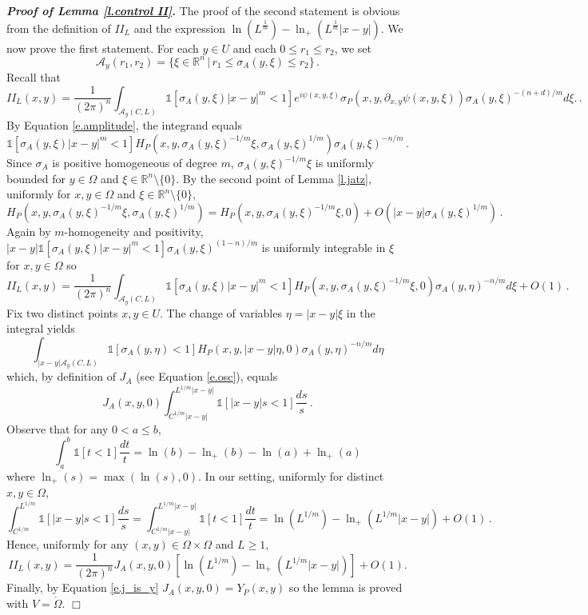 \documentclass[10pt,twoside]{article}
\newcommand{\R}{\mathbb{R}}
\newcommand{\one}{\mathds{1}}
\newcommand{\calA}{\mathcal{A}}
\newenvironment{prf}[1][]
{\vskip 2mm  {\it \bf Proof#1. }}{$\Box$ \vskip 2mm}
\numberwithin{theorem}{section}
\begin{document}
\begin{prf}[ of Lemma \ref{l.control II}]
The proof of the second statement is obvious from the definition of $II_L$ and the expression $\ln\left(L^{\frac{1}{m}}\right)-\ln_+\left(L^{\frac{1}{m}}|x-y|\right)$. We now prove the first statement. For each $y\in U$ and each $0\leq r_1\leq r_2$, we set
\[
\calA_y(r_1,r_2)=\{\xi\in\R^n\, |\, r_1\leq \sigma_A(y,\xi)\leq r_2\}\, .
\]
Recall that
\[
II_L(x,y)=\frac{1}{(2\pi)^n}\int_{\calA_y(C,L)}\one[\sigma_A(y,\xi)|x-y|^m< 1]e^{i\psi(x,y,\xi)}\sigma_P(x,y,\partial_{x,y}\psi(x,y,\xi))\sigma_A(y,\xi)^{-(n+d)/m}d\xi.\, .
\] 
By Equation \eqref{e.amplitude}, the integrand equals
\[
\one[\sigma_A(y,\xi)|x-y|^m< 1]H_P\left(x,y,\sigma_A(y,\xi)^{-1/m}\xi,\sigma_A(y,\xi)^{1/m}\right)\sigma_A(y,\xi)^{-n/m}\, .
\]
Since $\sigma_A$ is positive homogeneous of degree $m$, $\sigma_A(y,\xi)^{-1/m}\xi$ is uniformly bounded for $y\in\Omega$ and $\xi\in\R^n\setminus\{0\}$. By the second point of Lemma \ref{l.jatz}, uniformly for $x,y\in\Omega$ and $\xi\in\R^n\setminus\{0\}$,
\[
H_P\left(x,y,\sigma_A(y,\xi)^{-1/m}\xi,\sigma_A(y,\xi)^{1/m}\right)=H_P\left(x,y,\sigma_A(y,\xi)^{-1/m}\xi,0\right)+O\left(|x-y|\sigma_A(y,\xi)^{1/m}\right)\, .
\]
Again by $m$-homogeneity and positivity, $|x-y|\one[\sigma_A(y,\xi)|x-y|^m< 1]\sigma_A(y,\xi)^{(1-n)/m}$ is uniformly integrable in $\xi$ for $x,y\in\Omega$ so
\[
II_L(x,y)=\frac{1}{(2\pi)^n}\int_{\calA_y(C,L)}\one[\sigma_A(y,\xi)|x-y|^m< 1]H_P\left(x,y,\sigma_A(y,\xi)^{-1/m}\xi,0\right)\sigma_A(y,\eta)^{-n/m}d\xi+O(1)\, .
\]
Fix two distinct points $x,y\in U$. The change of variables $\eta=|x-y|\xi$ in the integral yields
\[
\int_{|x-y|\calA_y(C,L)}\one[\sigma_A(y,\eta)<1]H_P(x,y,|x-y|\eta,0)\sigma_A(y,\eta)^{-n/m}d\eta
\]
which, by definition of $J_A$ (see Equation \eqref{e.osc}), equals
\[
J_A(x,y,0)\int_{C^{1/m}|x-y|}^{L^{1/m}|x-y|}\one[|x-y|s<1]\frac{ds}{s}\, .
\]
Observe that for any $0<a\leq b$,
\[
\int_a^b\one[t<1]\frac{dt}{t}=\ln(b)-\ln_+(b)-\ln(a)+\ln_+(a)
\]
where $\ln_+(s)=\max(\ln(s),0)$. In our setting, uniformly for distinct $x,y\in\Omega$,
\[
\int_{C^{1/m}}^{L^{1/m}}\one[|x-y|s< 1]\frac{ds}{s}=\int_{C^{1/m}|x-y|}^{L^{1/m}|x-y|}\one[t< 1]\frac{dt}{t}=\ln\left(L^{1/m}\right)-\ln_+\left(L^{1/m}|x-y|\right)+O(1)\, .
\]
Hence, uniformly for any $(x,y)\in \Omega\times \Omega$ and $L\geq 1$,
\[
II_L(x,y)=\frac{1}{(2\pi)^n}J_A(x,y,0)\left[\ln\left(L^{1/m}\right)-\ln_+\left(L^{1/m}|x-y|\right)\right]+O(1).\]
Finally, by Equation \eqref{e.j_is_y} $J_A(x,y,0)=Y_P(x,y)$ so the lemma is proved with $V=\mathring{\Omega}$. 
\end{prf}
\end{document}
